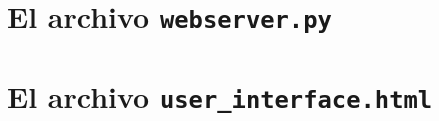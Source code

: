 %
%


\section{El archivo \texttt{webserver.py}}%
\label{sec:webserver-py}
\setlength{\columnsep}{1cm}
\begin{multicols}{2}

\end{multicols}

\section{El archivo \texttt{user\_interface.html}}%
\label{sec:ui-html}
\setlength{\columnsep}{1cm}
\begin{multicols}{2}

\end{multicols}